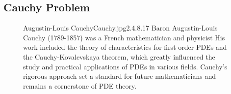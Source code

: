\subsection{Cauchy Problem}
\begin{figure}[b]
    \begin{minipage}[h]{\textwidth}
        \begin{enrichment}{Augustin-Louis Cauchy}{Cauchy.jpg}{2.4}{.8}{.17}
            Baron Augustin-Louis Cauchy (1789-1857) was a French mathematician and physicist 
            His work included the theory of characteristics for first-order PDEs and the Cauchy-Kovalevskaya theorem, which greatly influenced the study and practical applications of PDEs in various fields. Cauchy's rigorous approach set a standard for future mathematicians and remains a cornerstone of PDE theory.
        \end{enrichment} 
    \end{minipage}
\end{figure}

